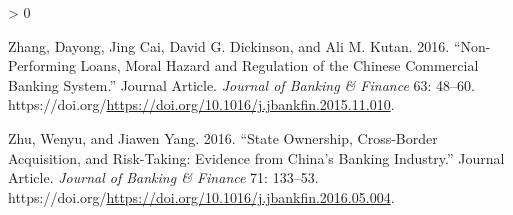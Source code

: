 \documentclass{article}
\newlength{\cslhangindent}
\newenvironment{CSLReferences}[2] %
 {%
  \setlength{\parindent}{0pt}
  \ifodd #1 \everypar{\setlength{\hangindent}{\cslhangindent}}\ignorespaces\fi
  \ifnum #2 > 0
  \setlength{\parskip}{#2\baselineskip}
  \fi
 }%
 {}
\begin{document}
\begin{CSLReferences}{1}{0}
\leavevmode\hypertarget{ref-RN77}{}%
Zhang, Dayong, Jing Cai, David G. Dickinson, and Ali M. Kutan. 2016.
{``Non-Performing Loans, Moral Hazard and Regulation of the Chinese
Commercial Banking System.''} Journal Article. \emph{Journal of Banking
\& Finance} 63: 48--60.
https://doi.org/\url{https://doi.org/10.1016/j.jbankfin.2015.11.010}.

\leavevmode\hypertarget{ref-RN78}{}%
Zhu, Wenyu, and Jiawen Yang. 2016. {``State Ownership, Cross-Border
Acquisition, and Risk-Taking: Evidence from China's Banking Industry.''}
Journal Article. \emph{Journal of Banking \& Finance} 71: 133--53.
https://doi.org/\url{https://doi.org/10.1016/j.jbankfin.2016.05.004}.

\end{CSLReferences}



\end{document}
